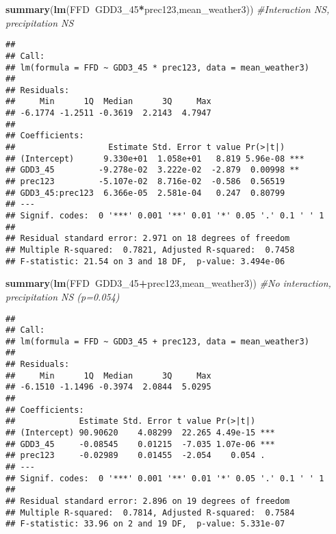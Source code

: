 \documentclass[10pt,]{article}
\newenvironment{Shaded}{\begin{snugshade}}{\end{snugshade}}
\newcommand{\KeywordTok}[1]{\textcolor[rgb]{0.13,0.29,0.53}{\textbf{#1}}}
\newcommand{\DecValTok}[1]{\textcolor[rgb]{0.00,0.00,0.81}{#1}}
\newcommand{\CommentTok}[1]{\textcolor[rgb]{0.56,0.35,0.01}{\textit{#1}}}
\newcommand{\OperatorTok}[1]{\textcolor[rgb]{0.81,0.36,0.00}{\textbf{#1}}}
\newcommand{\NormalTok}[1]{#1}
\begin{document}
\begin{Shaded}
\begin{Highlighting}[]
\KeywordTok{summary}\NormalTok{(}\KeywordTok{lm}\NormalTok{(FFD}\OperatorTok{~}\NormalTok{GDD3_}\DecValTok{45}\OperatorTok{*}\NormalTok{prec123,mean_weather3)) }\CommentTok{#Interaction NS, precipitation NS}
\end{Highlighting}
\end{Shaded}

\begin{verbatim}
## 
## Call:
## lm(formula = FFD ~ GDD3_45 * prec123, data = mean_weather3)
## 
## Residuals:
##     Min      1Q  Median      3Q     Max 
## -6.1774 -1.2511 -0.3619  2.2143  4.7947 
## 
## Coefficients:
##                   Estimate Std. Error t value Pr(>|t|)    
## (Intercept)      9.330e+01  1.058e+01   8.819 5.96e-08 ***
## GDD3_45         -9.278e-02  3.222e-02  -2.879  0.00998 ** 
## prec123         -5.107e-02  8.716e-02  -0.586  0.56519    
## GDD3_45:prec123  6.366e-05  2.581e-04   0.247  0.80799    
## ---
## Signif. codes:  0 '***' 0.001 '**' 0.01 '*' 0.05 '.' 0.1 ' ' 1
## 
## Residual standard error: 2.971 on 18 degrees of freedom
## Multiple R-squared:  0.7821, Adjusted R-squared:  0.7458 
## F-statistic: 21.54 on 3 and 18 DF,  p-value: 3.494e-06
\end{verbatim}

\begin{Shaded}
\begin{Highlighting}[]
\KeywordTok{summary}\NormalTok{(}\KeywordTok{lm}\NormalTok{(FFD}\OperatorTok{~}\NormalTok{GDD3_}\DecValTok{45}\OperatorTok{+}\NormalTok{prec123,mean_weather3)) }\CommentTok{#No interaction, precipitation NS (p=0.054)}
\end{Highlighting}
\end{Shaded}

\begin{verbatim}
## 
## Call:
## lm(formula = FFD ~ GDD3_45 + prec123, data = mean_weather3)
## 
## Residuals:
##     Min      1Q  Median      3Q     Max 
## -6.1510 -1.1496 -0.3974  2.0844  5.0295 
## 
## Coefficients:
##             Estimate Std. Error t value Pr(>|t|)    
## (Intercept) 90.90620    4.08299  22.265 4.49e-15 ***
## GDD3_45     -0.08545    0.01215  -7.035 1.07e-06 ***
## prec123     -0.02989    0.01455  -2.054    0.054 .  
## ---
## Signif. codes:  0 '***' 0.001 '**' 0.01 '*' 0.05 '.' 0.1 ' ' 1
## 
## Residual standard error: 2.896 on 19 degrees of freedom
## Multiple R-squared:  0.7814, Adjusted R-squared:  0.7584 
## F-statistic: 33.96 on 2 and 19 DF,  p-value: 5.331e-07
\end{verbatim}
\end{document}
